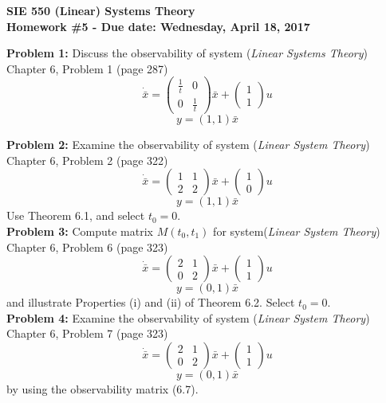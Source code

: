 \documentclass[12pt]{article}
\begin{document}
{\centering
 \textbf{SIE 550 (Linear) Systems Theory\\Homework \#5 - Due date: Wednesday, April 18, 2017 \newline}\par
 
} 

\noindent
\textbf{Problem 1:} Discuss the observability of system ({\em Linear Systems Theory}) Chapter 6, Problem 1 (page 287)
$$
\dot{\bar{x}}=
\begin{pmatrix} 
	\frac{1}{t} & 0 \\
	0 & \frac{1}{t}
\end{pmatrix} \bar{x} + 
\begin{pmatrix} 
1 \\
1
\end{pmatrix} u
$$
$$y=(1,1)\bar{x}$$
	
\noindent
\textbf{Problem 2:} Examine the observability of system ({\em Linear System Theory}) Chapter 6, Problem 2 (page 322)
$$
\dot{\bar{x}}=
\begin{pmatrix}
	1 & 1 \\
	2 & 2
\end{pmatrix}
\bar{x}+
\begin{pmatrix}
	1 \\
	0
\end{pmatrix} u
$$
$$y=(1,1)\bar{x}$$
Use Theorem 6.1, and select $t_0=0$.\\

\noindent
\textbf{Problem 3:} Compute matrix $M(t_0,t_1)$ for system({\em Linear System Theory}) Chapter 6, Problem 6 (page 323)
$$ \dot{\bar{x}} = 
\begin{pmatrix}
	2 & 1 \\
	0 & 2
\end{pmatrix} \bar{x} +
\begin{pmatrix} 
	1 \\
	1
\end{pmatrix} u
$$
$$y=(0,1)\bar{x}$$
and illustrate Properties (i) and (ii) of Theorem 6.2. Select $t_0=0$.\\

\noindent
\textbf{Problem 4:} Examine the observability of system ({\em Linear System Theory}) Chapter 6, Problem 7 (page 323)
$$ \dot{\bar{x}} = 
\begin{pmatrix}
	2 & 1 \\
	0 & 2
\end{pmatrix} \bar{x} +
\begin{pmatrix} 
	1 \\
	1
\end{pmatrix} u
$$
$$y=(0,1)\bar{x}$$
by using the observability matrix (6.7).\\
\end{document}
